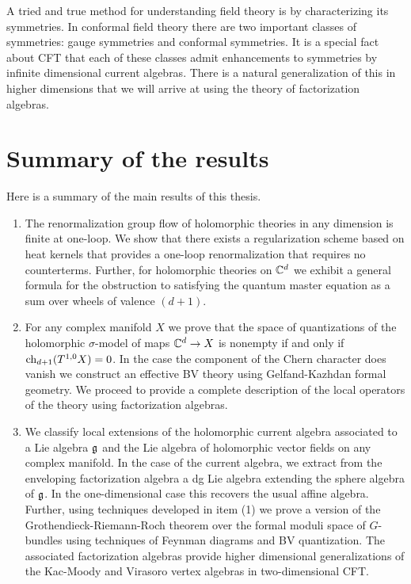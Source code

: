 A tried and true method for understanding field theory is by characterizing its symmetries. 
In conformal field theory there are two important classes of symmetries: gauge symmetries and conformal symmetries. 
It is a special fact about CFT that each of these classes admit enhancements to symmetries by infinite dimensional current algebras. 
There is a natural generalization of this in higher dimensions that we will arrive at using the theory of factorization algebras. 


\section{Summary of the results}

Here is a summary of the main results of this thesis.

\begin{enumerate}
\item The renormalization group flow of holomorphic theories in any dimension is finite at one-loop.
We show that there exists a regularization scheme based on heat kernels that provides a one-loop renormalization that requires no counterterms. 
Further, for holomorphic theories on $\mathbb C^d$ we exhibit a general formula for the obstruction to satisfying the quantum master equation as a sum over wheels of valence $(d+1)$. 

\item For any complex manifold $X$ we prove that the space of quantizations of the holomorphic $\sigma$-model of maps $\mathbb C^d \to X$ is nonempty if and only if ${\rm ch}_{d+1}(T^{1,0}X) = 0$. 
In the case the component of the Chern character does vanish we construct an effective BV theory using Gelfand-Kazhdan formal geometry.
We proceed to provide a complete description of the local operators of the theory using factorization algebras.

\item We classify local extensions of the holomorphic current algebra associated to a Lie algebra $\mathfrak g$ and the Lie algebra of holomorphic vector fields on any complex manifold.
In the case of the current algebra, we extract from the enveloping factorization algebra a dg Lie algebra extending the sphere algebra of $\mathfrak g$.
In the one-dimensional case this recovers the usual affine algebra.
Further, using techniques developed in item (1) we prove a version of the Grothendieck-Riemann-Roch theorem over the formal moduli space of $G$-bundles using techniques of Feynman diagrams and BV quantization.
The associated factorization algebras provide higher dimensional generalizations of the Kac-Moody and Virasoro vertex algebras in two-dimensional CFT. 

\end{enumerate}

